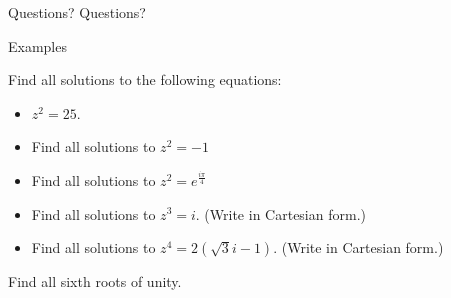 \documentclass{beamer}
\begin{document}
\begin{frame}{Questions?}
Questions?
\end{frame}

\begin{frame}{Examples}
\begin{example}
Find all solutions to the following equations:
\begin{itemize}
	\item $z^2 = 25$. %
	\item Find all solutions to $z^2 = -1$ %
	\item Find all solutions to $z^2 = e^{\frac{i\pi}{4}}$ %
	\item Find all solutions to $z^3 = i$. (Write in Cartesian form.) %
	\item Find all solutions to $z^4 = 2(\sqrt{3}i-1)$. (Write in Cartesian form.) %
\end{itemize}
\end{example}
\begin{example}
Find all sixth roots of unity.
\end{example}
\end{frame}
\end{document}

